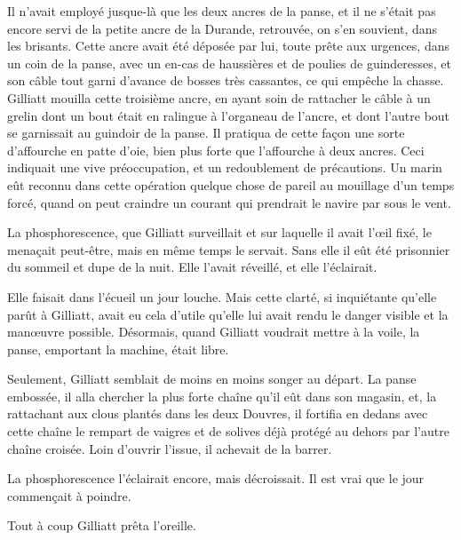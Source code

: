 \documentclass[french,twoside]{book} %
\begin{document}
Il n’avait employé jusque-là que les deux ancres de la panse, et il ne s’était pas encore servi de la petite ancre de la Durande, retrouvée, on s’en souvient, dans les brisants. Cette ancre avait été déposée par lui, toute prête aux urgences, dans un coin de la panse, avec un en-cas de haussières et de poulies de guinderesses, et son câble tout garni d’avance de bosses très cassantes, ce qui empêche la chasse. Gilliatt mouilla cette troisième ancre, en ayant soin de rattacher le câble à un grelin dont un bout était en ralingue à l’organeau de l’ancre, et dont l’autre bout se garnissait au guindoir de la panse. Il pratiqua de cette façon une sorte d’affourche en patte d’oie, bien plus forte que l’affourche à deux ancres. Ceci indiquait une vive préoccupation, et un redoublement de précautions. Un marin eût reconnu dans cette opération quelque chose de pareil au mouillage d’un temps forcé, quand on peut craindre un courant qui prendrait le navire par sous le vent.\par
La phosphorescence, que Gilliatt surveillait et sur laquelle il avait l’œil fixé, le menaçait peut-être, mais en même temps le servait. Sans elle il eût été  prisonnier du sommeil et dupe de la nuit. Elle l’avait réveillé, et elle l’éclairait.\par
Elle faisait dans l’écueil un jour louche. Mais cette clarté, si inquiétante qu’elle parût à Gilliatt, avait eu cela d’utile qu’elle lui avait rendu le danger visible et la manœuvre possible. Désormais, quand Gilliatt voudrait mettre à la voile, la panse, emportant la machine, était libre.\par
Seulement, Gilliatt semblait de moins en moins songer au départ. La panse embossée, il alla chercher la plus forte chaîne qu’il eût dans son magasin, et, la rattachant aux clous plantés dans les deux Douvres, il fortifia en dedans avec cette chaîne le rempart de vaigres et de solives déjà protégé au dehors par l’autre chaîne croisée. Loin d’ouvrir l’issue, il achevait de la barrer.\par
La phosphorescence l’éclairait encore, mais décroissait. Il est vrai que le jour commençait à poindre.\par
Tout à coup Gilliatt prêta l’oreille.
\end{document}
